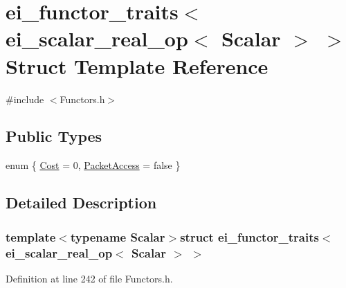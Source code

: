 \hypertarget{structei__functor__traits_3_01ei__scalar__real__op_3_01_scalar_01_4_01_4}{\section{ei\-\_\-functor\-\_\-traits$<$ ei\-\_\-scalar\-\_\-real\-\_\-op$<$ Scalar $>$ $>$ Struct Template Reference}
\label{structei__functor__traits_3_01ei__scalar__real__op_3_01_scalar_01_4_01_4}
}


{\ttfamily \#include $<$Functors.\-h$>$}

\subsection*{Public Types}
\begin{DoxyCompactItemize}
\item 
enum \{ \hyperlink{structei__functor__traits_3_01ei__scalar__real__op_3_01_scalar_01_4_01_4_a8178b19c2e1804ef292d139135d985fcae3ed9ba9e53c77fcfad2292db2b8eaa5}{Cost} = 0, 
\hyperlink{structei__functor__traits_3_01ei__scalar__real__op_3_01_scalar_01_4_01_4_a8178b19c2e1804ef292d139135d985fcafa3cfc1d424091bdfcab514b6ef57dc1}{Packet\-Access} = false
 \}
\end{DoxyCompactItemize}


\subsection{Detailed Description}
\subsubsection*{template$<$typename Scalar$>$struct ei\-\_\-functor\-\_\-traits$<$ ei\-\_\-scalar\-\_\-real\-\_\-op$<$ Scalar $>$ $>$}



Definition at line 242 of file Functors.\-h.



